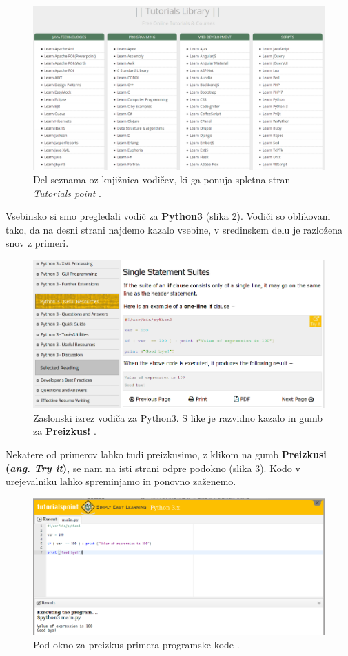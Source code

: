 \begin{figure}[h!]
  \centering
    \includegraphics [width=0.75\linewidth, keepaspectratio =
   1] {./images/sc_web/tutpoint_lib-v01.png}
   \caption{Del seznama oz knjižnica vodičev, ki ga ponuja spletna
     stran \emph{\href{http://www.tutorialspoint.com/}{Tutorials
         point}} \cite{web:tutorialspoint}.}
    \label{fig:web:tutpoint:lib}
\end{figure}

Vsebinsko si smo pregledali vodič za \textbf{Python3} (slika
\ref{fig:web:tutpoint:tut01}). Vodiči so oblikovani tako, da na desni
strani najdemo kazalo vsebine, v sredinskem delu je razložena snov z
primeri.

\begin{figure}[h!]
  \centering
    \includegraphics [width=0.65\linewidth, keepaspectratio =
   1] {./images/sc_web/tutpoint_tutP3-v01.png}
   \caption{Zaslonski izrez vodiča za Python3. S like je razvidno
     kazalo in gumb za \textbf{Preizkus!} \cite{web:tutorialspoint}.}
    \label{fig:web:tutpoint:tut01}
\end{figure}

Nekatere od primerov lahko tudi preizkusimo, z klikom na gumb
\textbf{Preizkusi (\emph{ang. Try it})}, se nam na isti strani odpre
podokno (slika \ref{fig:web:tutpoint:tut02}). Kodo v urejevalniku
lahko spreminjamo in ponovno zaženemo.

\begin{figure}[h!]
  \centering
    \includegraphics [width=0.65\linewidth, keepaspectratio =
   1] {./images/sc_web/tutpoint_tutP3-v02.png}
   \caption{Pod okno za preizkus primera programske kode
     \cite{web:tutorialspoint}.}
    \label{fig:web:tutpoint:tut02}
\end{figure}

